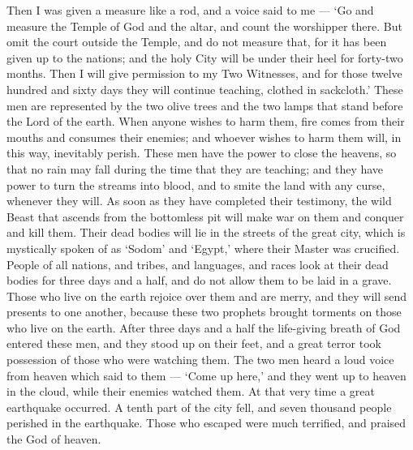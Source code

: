  Then I was given a measure like a rod, and a voice said to
me --- `Go and measure the Temple of God and the altar, and count the
worshipper there.  But omit the court outside the Temple,
and do not measure that, for it has been given up to the nations; and
the holy City will be under their heel for forty-two months.
 Then I will give permission to my Two Witnesses, and for
those twelve hundred and sixty days they will continue teaching, clothed
in sackcloth.'  These men are represented by the two olive
trees and the two lamps that stand before the Lord of the earth.
 When anyone wishes to harm them, fire comes from their
mouths and consumes their enemies; and whoever wishes to harm them will,
in this way, inevitably perish.  These men have the power to
close the heavens, so that no rain may fall during the time that they
are teaching; and they have power to turn the streams into blood, and to
smite the land with any curse, whenever they will.  As soon
as they have completed their testimony, the wild Beast that ascends from
the bottomless pit will make war on them and conquer and kill them.
 Their dead bodies will lie in the streets of the great
city, which is mystically spoken of as `Sodom' and `Egypt,' where their
Master was crucified.  People of all nations, and tribes,
and languages, and races look at their dead bodies for three days and a
half, and do not allow them to be laid in a grave.  Those
who live on the earth rejoice over them and are merry, and they will
send presents to one another, because these two prophets brought
torments on those who live on the earth.  After three days
and a half the life-giving breath of God entered these men, and they
stood up on their feet, and a great terror took possession of those who
were watching them.  The two men heard a loud voice from
heaven which said to them --- `Come up here,' and they went up to heaven
in the cloud, while their enemies watched them.  At that
very time a great earthquake occurred. A tenth part of the city fell,
and seven thousand people perished in the earthquake. Those who escaped
were much terrified, and praised the God of heaven.

